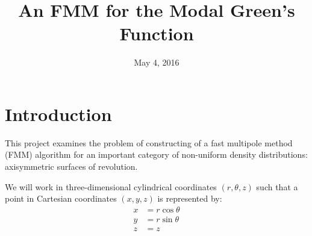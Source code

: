 \documentclass[11pt, oneside]{article}   	%
\title{An FMM for the Modal Green's Function}
\date{May 4, 2016}
\begin{document}
\maketitle

\section{Introduction}
This project examines the problem of constructing of a fast multipole method (FMM) algorithm for an important category of non-uniform density distributions: axisymmetric surfaces of revolution.

We will work in three-dimensional cylindrical coordinates $(r,\theta,z)$ such that a point in Cartesian coordinates $(x,y,z)$ is represented by:
\begin{align*}
x &= r\cos\theta\\
y &= r\sin\theta\\
z &= z
\end{align*}
\end{document}
